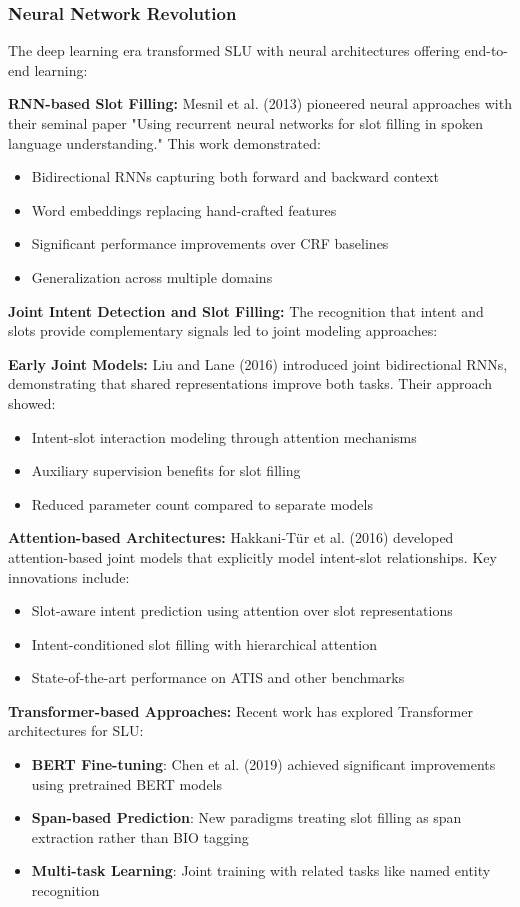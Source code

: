 \documentclass[conference]{IEEEtran}
\begin{document}
\subsubsection{Neural Network Revolution}
The deep learning era transformed SLU with neural architectures offering end-to-end learning:

\textbf{RNN-based Slot Filling:}
Mesnil et al. (2013) pioneered neural approaches with their seminal paper "Using recurrent neural networks for slot filling in spoken language understanding." This work demonstrated:
\begin{itemize}
  \item Bidirectional RNNs capturing both forward and backward context
  \item Word embeddings replacing hand-crafted features
  \item Significant performance improvements over CRF baselines
  \item Generalization across multiple domains
\end{itemize}

\textbf{Joint Intent Detection and Slot Filling:}
The recognition that intent and slots provide complementary signals led to joint modeling approaches:

\textbf{Early Joint Models:}
Liu and Lane (2016) introduced joint bidirectional RNNs, demonstrating that shared representations improve both tasks. Their approach showed:
\begin{itemize}
  \item Intent-slot interaction modeling through attention mechanisms
  \item Auxiliary supervision benefits for slot filling
  \item Reduced parameter count compared to separate models
\end{itemize}

\textbf{Attention-based Architectures:}
Hakkani-Tür et al. (2016) developed attention-based joint models that explicitly model intent-slot relationships. Key innovations include:
\begin{itemize}
  \item Slot-aware intent prediction using attention over slot representations
  \item Intent-conditioned slot filling with hierarchical attention
  \item State-of-the-art performance on ATIS and other benchmarks
\end{itemize}

\textbf{Transformer-based Approaches:}
Recent work has explored Transformer architectures for SLU:
\begin{itemize}
  \item \textbf{BERT Fine-tuning}: Chen et al. (2019) achieved significant improvements using pretrained BERT models
  \item \textbf{Span-based Prediction}: New paradigms treating slot filling as span extraction rather than BIO tagging
  \item \textbf{Multi-task Learning}: Joint training with related tasks like named entity recognition
\end{itemize}
\end{document}
